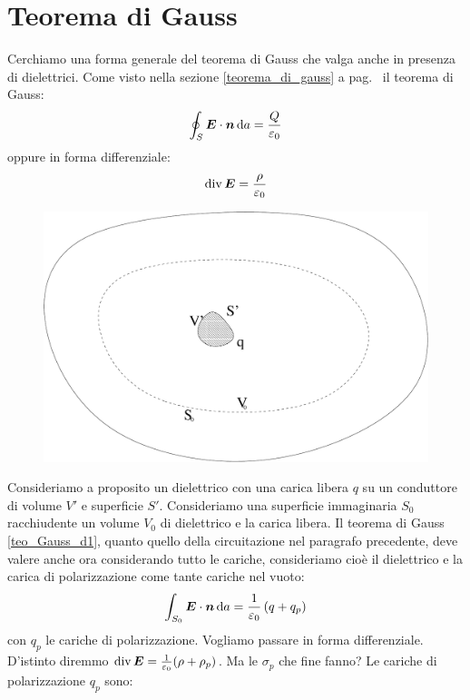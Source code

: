 \section{Teorema di Gauss}
Cerchiamo una forma generale del teorema di Gauss che valga anche in presenza di dielettrici. Come visto nella sezione \ref{teorema_di_gauss} a pag.~\pageref{teorema_di_gauss} il teorema di Gauss:
\begin{equation}
\oint_S\boldsymbol{E}\cdot\boldsymbol{n}\,\mathrm{d} a=\frac{Q}{\varepsilon_0}
\label{teo_Gauss_d1}
\end{equation}
oppure in forma differenziale:
\begin{equation}
\operatorname{div} \boldsymbol{E}=\frac{\rho}{\varepsilon_0}
\end{equation}
\begin{figure}[htbp]
\centering
\includegraphics[scale=0.35]{immagini/fisica2/gauss_dielettrici}
\end{figure}
Consideriamo a proposito un dielettrico con una carica libera $q$ su un conduttore di volume $V'$ e superficie $S'$. Consideriamo una superficie immaginaria $S_0$ racchiudente un volume $V_0$ di dielettrico e la carica libera. Il teorema di Gauss \eqref{teo_Gauss_d1}, quanto quello della circuitazione nel paragrafo precedente, deve valere anche ora considerando tutto le cariche, consideriamo cioè il dielettrico e la carica di polarizzazione come tante cariche nel vuoto:
\begin{equation}
\int_{S_0}\boldsymbol{E}\cdot\boldsymbol{n}\,\mathrm{d} a=\frac{1}{\varepsilon_0}\left(q+q_p\right)
\label{gauss_dielettrici_3}
\end{equation}
con $q_p$ le cariche di polarizzazione. Vogliamo passare in forma differenziale. D'istinto diremmo $\operatorname{div}\boldsymbol{E}=\frac{1}{\varepsilon_0}(\rho+\rho_p)$. Ma le $\sigma_p$ che fine fanno? Le cariche di polarizzazione $q_p$ sono:
